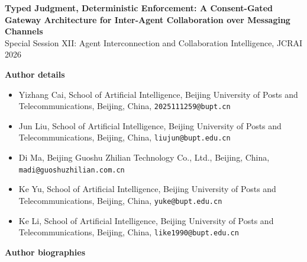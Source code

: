 \documentclass[11pt,a4paper]{article}
\begin{document}
\begin{center}{\Large\bfseries Typed Judgment, Deterministic Enforcement: A Consent-Gated Gateway Architecture for Inter-Agent Collaboration over Messaging Channels}\\[0.6em]
Special Session XII: Agent Interconnection and Collaboration Intelligence, JCRAI 2026
\end{center}
\vspace{1em}
{\bfseries Author details}
\begin{itemize}\setlength{\itemsep}{0.1em}\setlength{\parskip}{0em}
\item Yizhang Cai, School of Artificial Intelligence, Beijing University of Posts and Telecommunications, Beijing, China, \texttt{2025111259@bupt.cn}
\item Jun Liu, School of Artificial Intelligence, Beijing University of Posts and Telecommunications, Beijing, China, \texttt{liujun@bupt.edu.cn}
\item Di Ma, Beijing Guoshu Zhilian Technology Co., Ltd., Beijing, China, \texttt{madi@guoshuzhilian.com.cn}
\item Ke Yu, School of Artificial Intelligence, Beijing University of Posts and Telecommunications, Beijing, China, \texttt{yuke@bupt.edu.cn}
\item Ke Li, School of Artificial Intelligence, Beijing University of Posts and Telecommunications, Beijing, China, \texttt{like1990@bupt.edu.cn}
\end{itemize}
\vspace{1em}
{\bfseries Author biographies}
\end{document}
